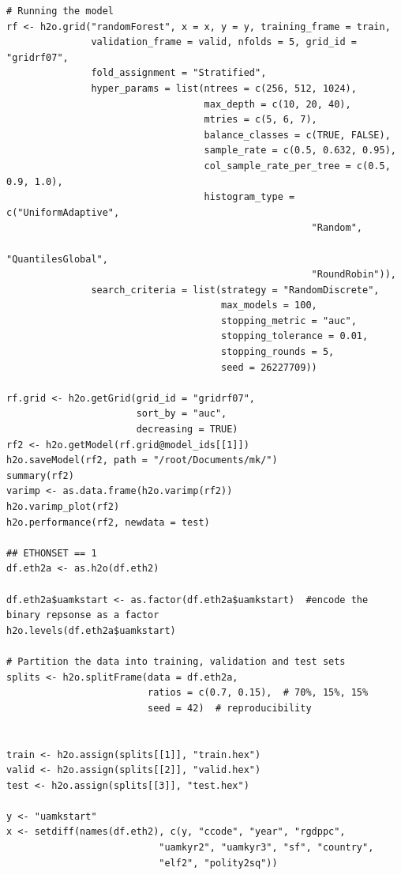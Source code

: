\begin{verbatim}
# Running the model
rf <- h2o.grid("randomForest", x = x, y = y, training_frame = train, 
               validation_frame = valid, nfolds = 5, grid_id = "gridrf07",
               fold_assignment = "Stratified",
               hyper_params = list(ntrees = c(256, 512, 1024),
                                   max_depth = c(10, 20, 40),
                                   mtries = c(5, 6, 7),
                                   balance_classes = c(TRUE, FALSE),
                                   sample_rate = c(0.5, 0.632, 0.95),
                                   col_sample_rate_per_tree = c(0.5, 0.9, 1.0),
                                   histogram_type = c("UniformAdaptive",
                                                      "Random",
                                                      "QuantilesGlobal",
                                                      "RoundRobin")),
               search_criteria = list(strategy = "RandomDiscrete", 
                                      max_models = 100, 
                                      stopping_metric = "auc", 
                                      stopping_tolerance = 0.01, 
                                      stopping_rounds = 5, 
                                      seed = 26227709)) 

rf.grid <- h2o.getGrid(grid_id = "gridrf07",
                       sort_by = "auc",
                       decreasing = TRUE)
rf2 <- h2o.getModel(rf.grid@model_ids[[1]])
h2o.saveModel(rf2, path = "/root/Documents/mk/")
summary(rf2)
varimp <- as.data.frame(h2o.varimp(rf2))
h2o.varimp_plot(rf2)
h2o.performance(rf2, newdata = test)

## ETHONSET == 1
df.eth2a <- as.h2o(df.eth2)

df.eth2a$uamkstart <- as.factor(df.eth2a$uamkstart)  #encode the binary repsonse as a factor
h2o.levels(df.eth2a$uamkstart)

# Partition the data into training, validation and test sets
splits <- h2o.splitFrame(data = df.eth2a, 
                         ratios = c(0.7, 0.15),  # 70%, 15%, 15%
                         seed = 42)  # reproducibility


train <- h2o.assign(splits[[1]], "train.hex")   
valid <- h2o.assign(splits[[2]], "valid.hex") 
test <- h2o.assign(splits[[3]], "test.hex")

y <- "uamkstart"
x <- setdiff(names(df.eth2), c(y, "ccode", "year", "rgdppc",
                           "uamkyr2", "uamkyr3", "sf", "country",
                           "elf2", "polity2sq")) 


\end{verbatim}

